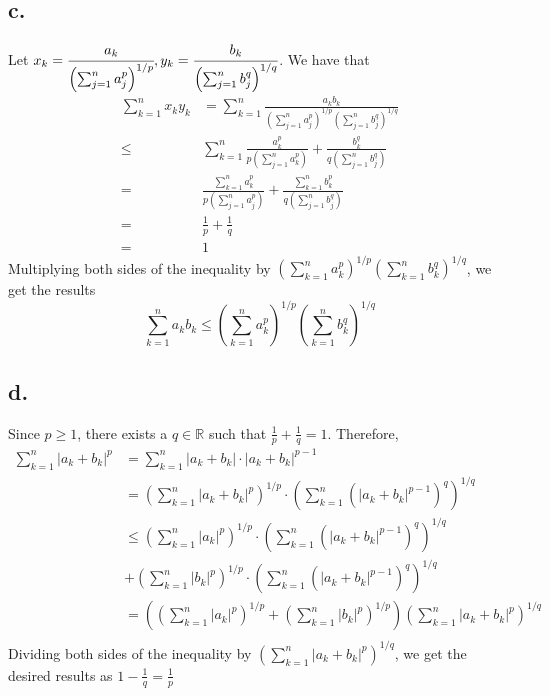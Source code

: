 \documentclass[11pt]{article}
\begin{document}
\subsection*{c.}
Let $x_k = \cfrac{a_k}{\left(\sum_{j=1}^n a_j^p \right)^{1/p}}, y_k = \cfrac{b_k}{\left(\sum_{j=1}^n b_j^q \right)^{1/q}}$.
We have that 
\begin{equation*}
    \begin{aligned}
        \sum_{k=1}^n x_ky_k &= \sum_{k=1}^n \frac{a_k b_k}{\left(\sum_{j=1}^n a_j^p \right)^{1/p} \left(\sum_{j=1}^n b_j^q \right)^{1/q}} \\
        \le & \sum_{k=1}^n 
        \frac{a_k^p}{p\left(\sum_{j=1}^n a_k^p \right)} 
        + \frac{b_k^q}{q\left(\sum_{j=1}^n b_j^q \right)}  \\
        =& \frac{\sum_{k=1}^n a_k^p}{p\left(\sum_{j=1}^n a_j^p \right)} 
        + \frac{\sum_{k=1}^n b_k^p}{q\left(\sum_{j=1}^n b_j^q \right)} \\
        =& \frac{1}{p} + \frac{1}{q} \\
        =& 1
    \end{aligned}
\end{equation*}
Multiplying both sides of the inequality by $\left(\sum_{k=1}^n a_k^p \right)^{1/p}\left(\sum_{k=1}^n b_k^q \right)^{1/q}$, we get the results 
\[
    \sum_{k=1}^n a_kb_k \le \left(\sum_{k=1}^n a_k^p \right)^{1/p}\left(\sum_{k=1}^n b_k^q \right)^{1/q}    
\]
\subsection*{d.}
Since $p\ge 1$, there exists a $q \in \mathbb{R}$ such that $\frac{1}{p}+ \frac{1}{q} = 1$. Therefore, 
\begin{equation*}
    \begin{aligned}
        \sum_{k=1}^n |a_k + b_k|^p 
        &= \sum_{k=1}^n |a_k + b_k| \cdot |a_k+b_k|^{p-1} \\
        &= \left(\sum_{k=1}^n |a_k + b_k|^p \right)^{1/p} \cdot 
        \left( \sum_{k=1}^n (|a_k + b_k|^{p-1} )^q \right)^{1/q} \\
        &\le \left(\sum_{k=1}^n |a_k|^p \right)^{1/p} \cdot
        \left( \sum_{k=1}^n (|a_k + b_k|^{p-1} )^q \right)^{1/q} \\
        & +\left(\sum_{k=1}^n |b_k|^p \right)^{1/p} \cdot
        \left( \sum_{k=1}^n (|a_k + b_k|^{p-1} )^q \right)^{1/q} \\
        &= \left(\left(\sum_{k=1}^n |a_k|^p \right)^{1/p} 
        + \left(\sum_{k=1}^n |b_k|^p \right)^{1/p} \right)
        \left( \sum_{k=1}^n |a_k + b_k|^p \right)^{1/q} \\
    \end{aligned}
\end{equation*}
\pagebreak
Dividing both sides of the inequality by $\left( \sum_{k=1}^n |a_k + b_k|^p \right)^{1/q}$, we get the desired results as $1-\frac{1}{q}=\frac{1}{p}$
\end{document}

